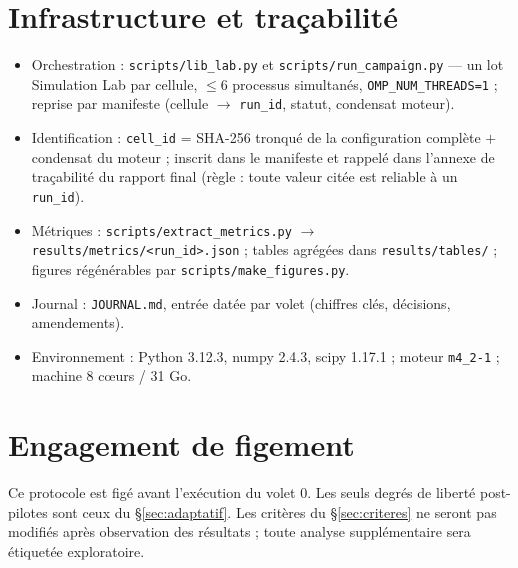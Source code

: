 \documentclass[11pt,a4paper]{article}
\newcommand{\code}[1]{\texttt{#1}}
\begin{document}
\section{Infrastructure et traçabilité}

\begin{itemize}
\item Orchestration : \code{scripts/lib\_lab.py} et
\code{scripts/run\_campaign.py} --- un lot Simulation Lab par cellule,
$\le6$ processus simultanés, \code{OMP\_NUM\_THREADS=1} ; reprise par
manifeste (cellule $\to$ \code{run\_id}, statut, condensat moteur).
\item Identification : \code{cell\_id} = SHA-256 tronqué de la
configuration complète $+$ condensat du moteur ; inscrit dans le manifeste
et rappelé dans l'annexe de traçabilité du rapport final (règle : toute
valeur citée est reliable à un \code{run\_id}).
\item Métriques : \code{scripts/extract\_metrics.py} $\to$
\code{results/metrics/<run\_id>.json} ; tables agrégées dans
\code{results/tables/} ; figures régénérables par
\code{scripts/make\_figures.py}.
\item Journal : \code{JOURNAL.md}, entrée datée par volet (chiffres clés,
décisions, amendements).
\item Environnement : Python 3.12.3, numpy 2.4.3, scipy 1.17.1 ;
moteur \code{m4\_2-1} ; machine 8 cœurs / 31 Go.
\end{itemize}

\section*{Engagement de figement}

Ce protocole est figé avant l'exécution du volet 0. Les seuls degrés de
liberté post-pilotes sont ceux du §\ref{sec:adaptatif}. Les critères du
§\ref{sec:criteres} ne seront pas modifiés après observation des
résultats ; toute analyse supplémentaire sera étiquetée exploratoire.
\end{document}

